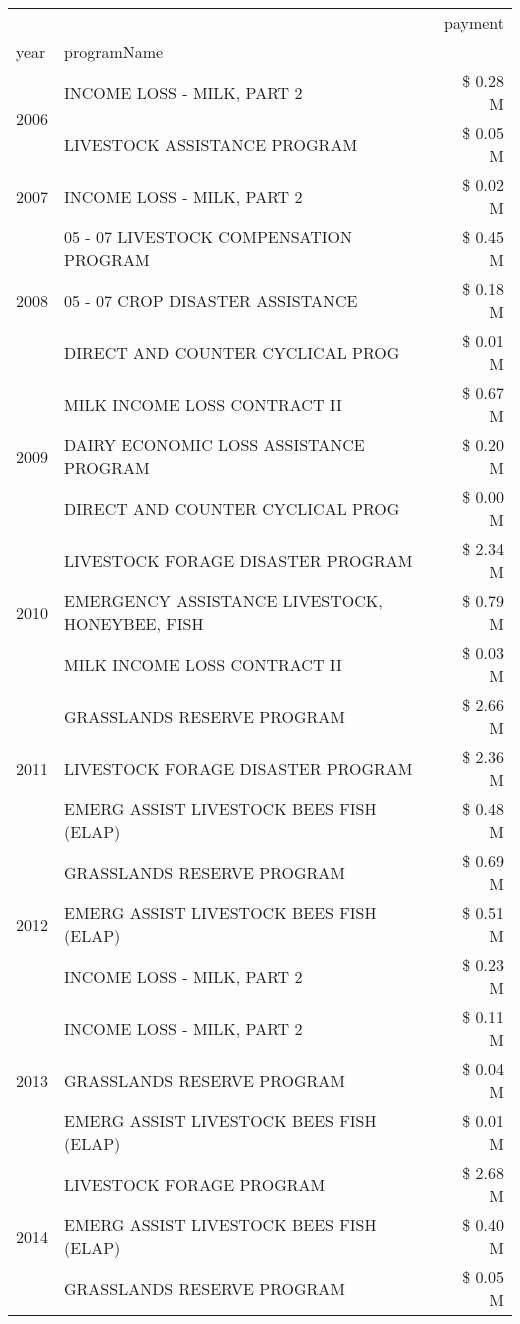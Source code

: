 \begin{tabular}{llr}
\toprule
 &  & payment \\
year & programName &  \\
\midrule
\multirow[t]{2}{*}{2006} & INCOME LOSS - MILK, PART 2 & \$ 0.28 M \\
 & LIVESTOCK ASSISTANCE PROGRAM & \$ 0.05 M \\
\cline{1-3}
2007 & INCOME LOSS - MILK, PART 2 & \$ 0.02 M \\
\cline{1-3}
\multirow[t]{3}{*}{2008} & 05 - 07 LIVESTOCK COMPENSATION PROGRAM & \$ 0.45 M \\
 & 05 - 07 CROP DISASTER ASSISTANCE & \$ 0.18 M \\
 & DIRECT AND COUNTER CYCLICAL PROG & \$ 0.01 M \\
\cline{1-3}
\multirow[t]{3}{*}{2009} & MILK INCOME LOSS CONTRACT II & \$ 0.67 M \\
 & DAIRY ECONOMIC LOSS ASSISTANCE PROGRAM & \$ 0.20 M \\
 & DIRECT AND COUNTER CYCLICAL PROG & \$ 0.00 M \\
\cline{1-3}
\multirow[t]{3}{*}{2010} & LIVESTOCK FORAGE DISASTER  PROGRAM & \$ 2.34 M \\
 & EMERGENCY ASSISTANCE LIVESTOCK, HONEYBEE, FISH & \$ 0.79 M \\
 & MILK INCOME LOSS CONTRACT II & \$ 0.03 M \\
\cline{1-3}
\multirow[t]{3}{*}{2011} & GRASSLANDS RESERVE PROGRAM & \$ 2.66 M \\
 & LIVESTOCK FORAGE DISASTER PROGRAM & \$ 2.36 M \\
 & EMERG ASSIST LIVESTOCK BEES FISH (ELAP) & \$ 0.48 M \\
\cline{1-3}
\multirow[t]{3}{*}{2012} & GRASSLANDS RESERVE PROGRAM & \$ 0.69 M \\
 & EMERG ASSIST LIVESTOCK BEES FISH (ELAP) & \$ 0.51 M \\
 & INCOME LOSS - MILK, PART 2 & \$ 0.23 M \\
\cline{1-3}
\multirow[t]{3}{*}{2013} & INCOME LOSS - MILK, PART 2 & \$ 0.11 M \\
 & GRASSLANDS RESERVE PROGRAM & \$ 0.04 M \\
 & EMERG ASSIST LIVESTOCK BEES FISH (ELAP) & \$ 0.01 M \\
\cline{1-3}
\multirow[t]{3}{*}{2014} & LIVESTOCK FORAGE PROGRAM & \$ 2.68 M \\
 & EMERG ASSIST LIVESTOCK BEES FISH (ELAP) & \$ 0.40 M \\
 & GRASSLANDS RESERVE PROGRAM & \$ 0.05 M \\

\end{tabular}
